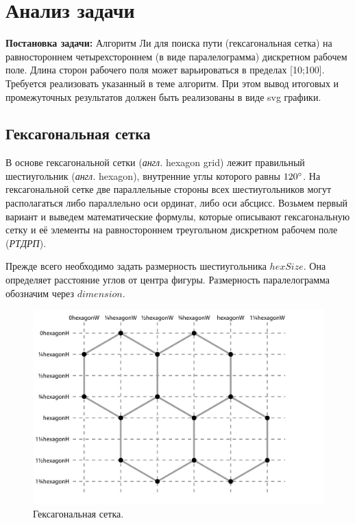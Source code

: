 \chapter{Анализ задачи}
\label{cha:analysis}
\textbf{Постановка задачи:} Алгоритм Ли для поиска пути (гексагональная сетка) на равностороннем 
четырехстороннем (в виде паралелограмма) дискретном рабочем поле. Длина сторон рабочего поля может
 варьироваться в пределах [10;100]. Требуется реализовать указанный в теме алгоритм. При этом вывод 
 итоговых и промежуточных результатов должен быть реализованы в виде svg графики.
\section{Гексагональная сетка}
В основе гексагональной сетки (\textit{англ.} hexagon grid) лежит правильный шестиугольник (\textit{англ.} hexagon), 
внутренние углы которого равны $120 \degree$. На гексагональной сетке две параллельные стороны 
всех шестиугольников могут располагаться либо параллельно оси ординат, либо оси абсцисс. Возьмем 
первый вариант и выведем математические формулы, которые описывают гексагональную сетку и 
её элементы на равностороннем треугольном дискретном рабочем поле (\textit{РТДРП}).
\par
Прежде всего необходимо задать размерность шестиугольника $hexSize$.
Она определяет расстояние углов от центра фигуры. 
Размерность паралелограмма обозначим через $dimension$.

\begin{figure}
	\centering
	\includegraphics[height=0.35\textheight]{inc/img/hexagon_grid}
	\caption{Гексагональная сетка.}
	\label{analysis:hexagonGridWithPoints}
\end{figure}

